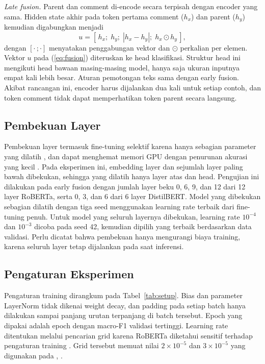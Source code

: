 \documentclass[conference]{IEEEtran}
\begin{document}
\textit{Late fusion.} Parent dan comment di-encode secara terpisah dengan encoder yang sama. Hidden state akhir pada token pertama comment ($h_x$) dan parent ($h_y$) kemudian digabungkan menjadi
\begin{equation}
u = [\,h_x;\; h_y;\; |h_x - h_y|;\; h_x \odot h_y\,],
\label{eq:fusion}
\end{equation}
dengan $[\cdot\,;\cdot]$ menyatakan penggabungan vektor dan $\odot$ perkalian per elemen. Vektor $u$ pada (\ref{eq:fusion}) diteruskan ke head klasifikasi. Struktur head ini mengikuti head bawaan masing-masing model, hanya saja ukuran inputnya empat kali lebih besar. Aturan pemotongan teks sama dengan early fusion. Akibat rancangan ini, encoder harus dijalankan dua kali untuk setiap contoh, dan token comment tidak dapat memperhatikan token parent secara langsung.

\subsection{Pembekuan Layer}
Pembekuan layer termasuk fine-tuning selektif karena hanya sebagian parameter yang dilatih \cite{han2024peft}, dan dapat menghemat memori GPU dengan penurunan akurasi yang kecil \cite{ardakani2024slimfit}. Pada eksperimen ini, embedding layer dan sejumlah layer paling bawah dibekukan, sehingga yang dilatih hanya layer atas dan head. Pengujian ini dilakukan pada early fusion dengan jumlah layer beku 0, 6, 9, dan 12 dari 12 layer RoBERTa, serta 0, 3, dan 6 dari 6 layer DistilBERT. Model yang dibekukan sebagian dilatih dengan tiga seed menggunakan learning rate terbaik dari fine-tuning penuh. Untuk model yang seluruh layernya dibekukan, learning rate $10^{-4}$ dan $10^{-3}$ dicoba pada seed 42, kemudian dipilih yang terbaik berdasarkan data validasi. Perlu dicatat bahwa pembekuan hanya mengurangi biaya training, karena seluruh layer tetap dijalankan pada saat inferensi.

\subsection{Pengaturan Eksperimen}
Pengaturan training dirangkum pada Tabel~\ref{tab:setup}. Bias dan parameter LayerNorm tidak dikenai weight decay, dan padding pada setiap batch hanya dilakukan sampai panjang urutan terpanjang di batch tersebut. Epoch yang dipakai adalah epoch dengan macro-F1 validasi tertinggi. Learning rate ditentukan melalui pencarian grid karena RoBERTa diketahui sensitif terhadap pengaturan training \cite{jimenez2026bert}. Grid tersebut memuat nilai $2 \times 10^{-5}$ dan $3 \times 10^{-5}$ yang digunakan pada \cite{dubey2026efficient}, \cite{ullah2026advanced}.
\end{document}
